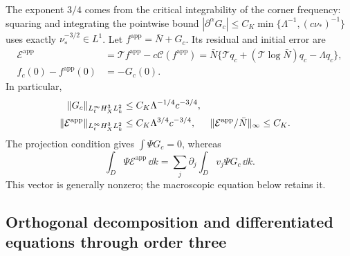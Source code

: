 The exponent $3/4$ comes from the critical integrability of the corner
frequency: squaring and integrating the pointwise bound
$|\partial^\alpha G_c|\le C_K\min\{\Lambda^{-1},(c\nu_*)^{-1}\}$
uses exactly $\nu_*^{-3/2}\in L^1$.
Let $f^{\mathrm{app}}=\bar N+G_c$. Its residual and initial error are
\begin{align}
 \mathcal E^{\mathrm{app}}
  &=\mathcal T f^{\mathrm{app}}-c\mathcal C(f^{\mathrm{app}})
    =\bar N\{\mathcal Tq_c+(\mathcal T\log\bar N)q_c-\Lambda q_c\},
       \label{hyd:residual}\\
 f_c(0)-f^{\mathrm{app}}(0)&=-G_c(0).
       \label{hyd:initial-layer}
\end{align}
In particular,
\begin{align}
 \|G_c\|_{L^\infty_tH_X^3L_k^2}
       &\le C_K\Lambda^{-1/4}c^{-3/4},\notag\\
 \|\mathcal E^{\mathrm{app}}\|_{L^\infty_tH_X^3L_k^2}
       &\le C_K\Lambda^{3/4}c^{-3/4},
 &\|\mathcal E^{\mathrm{app}}/\bar N\|_\infty&\le C_K.
       \label{hyd:residual-bounds}
\end{align}
The projection condition gives $\int\Psi G_c=0$, whereas
\begin{equation}\label{hyd:residual-moments}
 \int_D\Psi\mathcal E^{\mathrm{app}}\,\dd k
   =\sum_j\partial_j\int_Dv_j\Psi G_c\,\dd k.
\end{equation}
This vector is generally nonzero; the macroscopic equation below retains it.

\subsection{Orthogonal decomposition and differentiated equations through order three}
\label{hyd:coframe-section}

